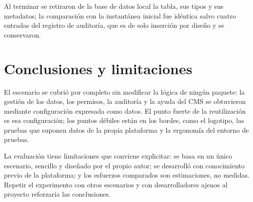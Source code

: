 Al terminar se retiraron de la base de datos local la tabla, sus tipos y sus
metadatos; la comparación con la instantánea inicial fue idéntica salvo
cuatro entradas del registro de auditoría, que es de solo inserción por
diseño y se conservaron.

\section{Conclusiones y limitaciones}
\label{sec:eval-conclusiones}

El escenario se cubrió por completo sin modificar la lógica de ningún
paquete: la gestión de los datos, los permisos, la auditoría y la ayuda del
CMS se obtuvieron mediante configuración expresada como datos. El punto
fuerte de la reutilización es esa configuración; los puntos débiles están en
los bordes, como el logotipo, las pruebas que suponen datos de la propia
plataforma y la ergonomía del entorno de pruebas.

La evaluación tiene limitaciones que conviene explicitar: se basa en un único
escenario, sencillo y diseñado por el propio autor; se desarrolló con
conocimiento previo de la plataforma; y los esfuerzos comparados son
estimaciones, no medidas. Repetir el experimento con otros escenarios y con
desarrolladores ajenos al proyecto reforzaría las conclusiones.
